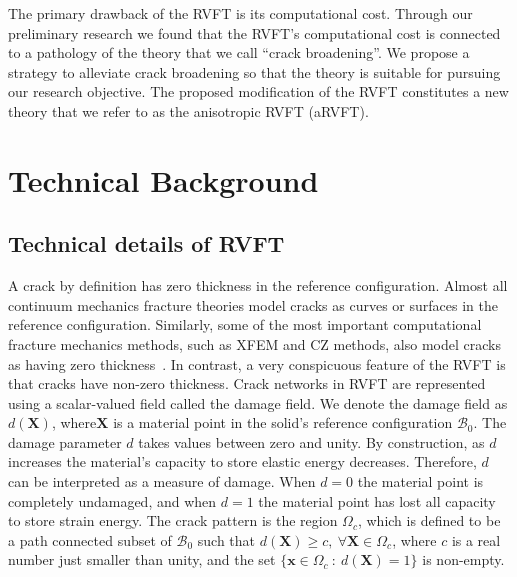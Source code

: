 \documentclass[10pt,letterpaper]{article}
\newcommand{\bs}[1]{\ensuremath{\boldsymbol{#1}}}
\begin{document}
%
    The primary drawback of the RVFT is its computational cost. Through our preliminary research we found that the RVFT's  computational cost is connected to a pathology of the theory that we call  ``crack broadening''. 
     We propose a strategy to alleviate crack broadening so that the theory is suitable for pursuing our research objective. The proposed modification of the RVFT constitutes a new theory that we refer to as the anisotropic RVFT (aRVFT). 

\section{Technical Background}
  \subsection{Technical details of RVFT}
    \label{s:RVFTdetails}


    A crack by definition has zero thickness in the reference configuration. Almost all  continuum mechanics fracture theories model cracks as curves or surfaces in the reference configuration. Similarly, some of the most important computational fracture mechanics methods, such as XFEM and CZ methods, also model cracks as having zero thickness~\cite{day1994zero,benvenuti2008regularized}. In contrast, a very conspicuous feature of the RVFT is that cracks have non-zero thickness. Crack networks in RVFT are represented using a scalar-valued field called the damage field. We denote the damage field as  $d(\bs{X})$, where$\bs{X}$ is a material point in the solid's reference configuration $\mathcal{B}_0$. The damage parameter $d$ takes values between zero and unity. By construction, as $d$ increases the material's capacity to store elastic energy decreases. Therefore, $d$ can be interpreted as a measure of damage. When $d=0$ the material point is completely undamaged, and when $d=1$ the material point has lost all capacity to store strain energy. The crack pattern is the region $\Omega_c$, which is defined to be a path connected subset of $\mathcal{B}_0$ such that $d(\bs{X})\ge c,~\forall\bs{X}\in \Omega_c$, where $c$ is a real number just smaller than unity, and the set $\{\bs{x}\in \Omega_c~:~d(\bs{X})=1\}$ is non-empty.
\end{document}
